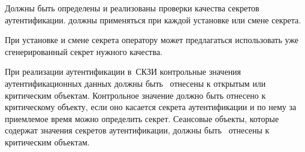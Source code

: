 \label{R.IA.PwdSet}
Должны быть определены и реализованы  проверки качества 
секретов аутентификации.  должны применяться при каждой 
установке или смене секрета.

\begin{note}
При установке и смене секрета оператору может предлагаться использовать
уже сгенерированный секрет нужного качества.
\end{note}

\label{R.IA.AuthProtect}
При реализации  аутентификации в~СКЗИ контрольные значения 
аутентификационных данных должны быть~ отнесены к открытым
или критическим объектам.
%
Контрольное значение должно быть отнесено к критическому объекту, 
если оно касается секрета аутентификации и по нему за приемлемое
время можно определить секрет.
%
Сеансовые объекты, которые содержат значения секретов аутентификации,
должны быть~ отнесены к критическим объектам.


